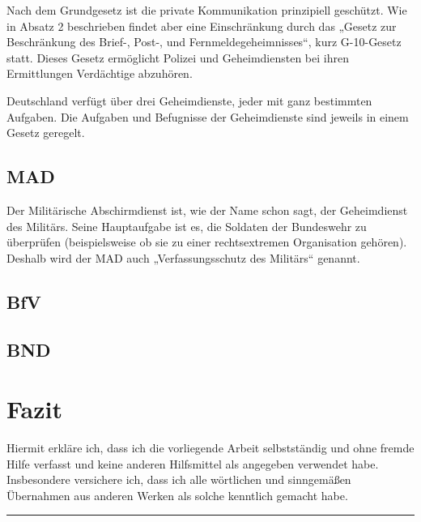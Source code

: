 \documentclass[12pt,a4paper]{scrartcl}
\begin{document}
Nach dem Grundgesetz ist die private Kommunikation prinzipiell geschützt. Wie in Absatz 2 beschrieben findet aber eine Einschränkung durch das „Gesetz zur Beschränkung des Brief-, Post-, und Fernmeldegeheimnisses“, kurz G-10-Gesetz statt. Dieses Gesetz ermöglicht Polizei und Geheimdiensten bei ihren Ermittlungen Verdächtige abzuhören.

Deutschland verfügt über drei Geheimdienste, jeder mit ganz bestimmten Aufgaben. Die Aufgaben und Befugnisse der Geheimdienste sind jeweils in einem Gesetz geregelt.
\subsection{MAD}
Der Militärische Abschirmdienst ist, wie der Name schon sagt, der Geheimdienst des Militärs. Seine Hauptaufgabe ist es, die Soldaten der Bundeswehr zu überprüfen (beispielsweise ob sie zu einer rechtsextremen Organisation gehören). Deshalb wird der MAD auch „Verfassungsschutz des Militärs“ genannt.

\subsection{BfV}

\subsection{BND}

\section{Fazit}

\newpage
\printbibliography
\newpage

Hiermit erkläre ich, dass ich die vorliegende Arbeit selbstständig und ohne fremde Hilfe verfasst und keine anderen Hilfsmittel als angegeben verwendet habe. Insbesondere versichere ich, dass ich alle wörtlichen und sinngemäßen Übernahmen aus anderen Werken als solche kenntlich gemacht habe.
\vspace{2cm}
\hrule
\end{document}
